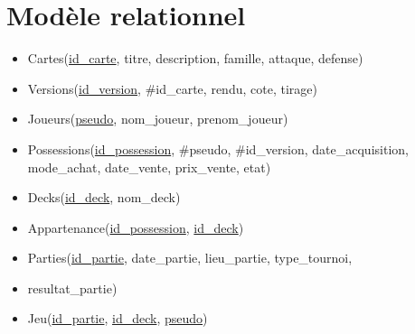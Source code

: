 \documentclass{article}
\begin{document}
\section{Modèle relationnel}

\begin{itemize}


    \item[] Cartes(\underline{id\_carte}, titre, description, famille, attaque, defense) \\
    \item[] Versions(\underline{id\_version}, \#id\_carte, rendu, cote, tirage) \\
    \item[] Joueurs(\underline{pseudo}, nom\_joueur, prenom\_joueur) \\
    \item[] Possessions(\underline{id\_possession}, \#pseudo, \#id\_version, date\_acquisition, mode\_achat, date\_vente, prix\_vente, etat) \\
    \item[] Decks(\underline{id\_deck}, nom\_deck) \\
    \item[] Appartenance(\underline{id\_possession}, \underline{id\_deck}) \\
    \item[] Parties(\underline{id\_partie}, date\_partie, lieu\_partie, type\_tournoi,
    \item[] resultat\_partie) \\
    \item[] Jeu(\underline{id\_partie}, \underline{id\_deck}, \underline{pseudo}) \\

\end{itemize}
\end{document}

